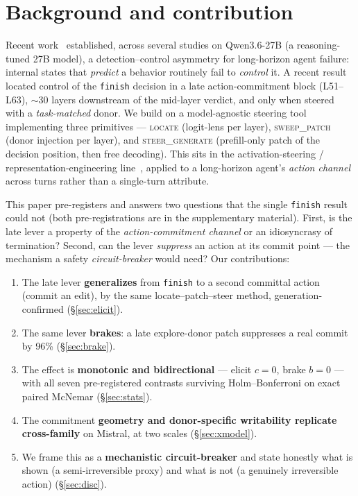 \documentclass[11pt]{article}
\begin{document}
\section{Background and contribution}\label{sec:bg}
Recent work~\cite{toolentropy,rightlocus,verdict,leverislate} established, across several studies on Qwen3.6-27B
(a reasoning-tuned 27B model), a detection--control asymmetry for long-horizon agent failure: internal states
that \emph{predict} a behavior routinely fail to \emph{control} it. A recent result~\cite{leverislate} located
control of the \texttt{finish} decision in a late action-commitment block (L51--L63), $\sim$30 layers
downstream of the mid-layer verdict, and only when steered with a \emph{task-matched} donor. We build on a
model-agnostic steering tool implementing three primitives --- \textsc{locate} (logit-lens per layer),
\textsc{sweep\_patch} (donor injection per layer), and \textsc{steer\_generate} (prefill-only patch of the
decision position, then free decoding). This sits in the activation-steering / representation-engineering
line~\cite{actadd,repe}, applied to a long-horizon agent's \emph{action channel} across turns rather than a
single-turn attribute.

This paper pre-registers and answers two questions that the single \texttt{finish} result could not (both
pre-registrations are in the supplementary material). First, is the late lever a property of the
\emph{action-commitment channel} or an idiosyncrasy of termination? Second, can the lever \emph{suppress} an
action at its commit point --- the mechanism a safety \emph{circuit-breaker} would need? Our contributions:
\begin{enumerate}\itemsep1pt
  \item The late lever \textbf{generalizes} from \texttt{finish} to a second committal action (commit an edit),
    by the same locate--patch--steer method, generation-confirmed (\S\ref{sec:elicit}).
  \item The same lever \textbf{brakes}: a late explore-donor patch suppresses a real commit by 96\%
    (\S\ref{sec:brake}).
  \item The effect is \textbf{monotonic and bidirectional} --- elicit $c{=}0$, brake $b{=}0$ --- with all seven
    pre-registered contrasts surviving Holm--Bonferroni on exact paired McNemar (\S\ref{sec:stats}).
  \item The commitment \textbf{geometry and donor-specific writability replicate cross-family} on Mistral, at
    two scales (\S\ref{sec:xmodel}).
  \item We frame this as a \textbf{mechanistic circuit-breaker} and state honestly what is shown (a
    semi-irreversible proxy) and what is not (a genuinely irreversible action) (\S\ref{sec:disc}).
\end{enumerate}
\end{document}
